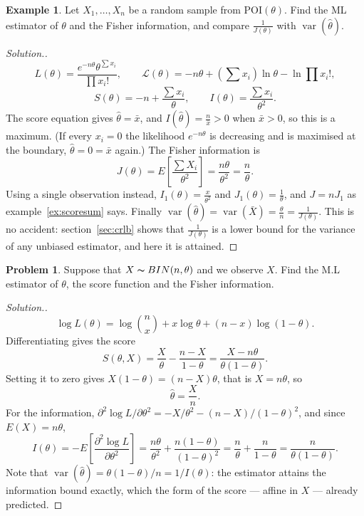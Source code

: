 \documentclass[12pt,a4paper]{report}
\theoremstyle{definition}
\newtheorem{exa}[thm]{Example}
\DeclareMathOperator{\var}{var}
\newtheorem{problemx}{Problem}[section]
\newenvironment{problem}{\begin{problemx}}{\end{problemx}}
\newenvironment{solution}
  {\renewcommand{\qedsymbol}{}\begin{proof}[\textit{Solution}.]}
  {\end{proof}}
\begin{document}
\begin{exa}
\label{ex:poissonmle}
Let $X_1, \dots, X_n$ be a random sample from $\text{POI}(\theta)$. Find the ML
estimator of $\theta$ and the Fisher information, and compare $\frac{1}{J(\theta)}$
with $\var(\hat\theta)$.
\end{exa}

\begin{solution}
\[L(\theta) = \frac{e^{-n\theta}\theta^{\sum x_i}}{\prod x_i!},\qquad
\mathcal{L}(\theta) = -n\theta + \left(\sum x_i\right)\ln\theta - \ln\prod x_i!,\]
\[S(\theta) = -n + \frac{\sum x_i}{\theta},\qquad I(\theta) = \frac{\sum x_i}{\theta^2} .\]
The score equation gives $\hat\theta = \bar x$, and $I(\hat\theta) = \frac{n}{\bar x}>0$
when $\bar x>0$, so this is a maximum. (If every $x_i = 0$ the likelihood $e^{-n\theta}$
is decreasing and is maximised at the boundary, $\hat\theta = 0 = \bar x$ again.)
The Fisher information is
\[J(\theta) = E\left[\frac{\sum X_i}{\theta^2}\right] = \frac{n\theta}{\theta^2} = \frac n\theta .\]
Using a single observation instead, $I_1(\theta) = \frac{x}{\theta^2}$ and
$J_1(\theta) = \frac1\theta$, and $J = nJ_1$ as example~\ref{ex:scoresum} says.
Finally $\var(\hat\theta) = \var(\bar X) = \frac\theta n = \frac{1}{J(\theta)}$. This is
no accident: section~\ref{sec:crlb} shows that $\frac{1}{J(\theta)}$ is a lower bound
for the variance of any unbiased estimator, and here it is attained.
\end{solution}

\begin{problem}
Suppose that $X\thicksim BIN(n,\theta)$ and we observe $X$. Find the M.L estimator of $\theta$, the score function and the Fisher information.
\end{problem}

\begin{solution}
\[\log L(\theta) = \log\binom{n}{x} + x\log\theta + (n-x)\log(1-\theta).\]
Differentiating gives the score
\[S(\theta,X) = \frac{X}{\theta} - \frac{n-X}{1-\theta}
= \frac{X-n\theta}{\theta(1-\theta)} .\]
Setting it to zero gives $X(1-\theta)=(n-X)\theta$, that is $X=n\theta$, so
\[\widehat{\theta} = \frac{X}{n}.\]
For the information, $\partial^{2}\log L/\partial\theta^{2}
= -X/\theta^{2} - (n-X)/(1-\theta)^{2}$, and since $E(X)=n\theta$,
\[I(\theta) = -E\left[\frac{\partial^{2}\log L}{\partial\theta^{2}}\right]
= \frac{n\theta}{\theta^{2}} + \frac{n(1-\theta)}{(1-\theta)^{2}}
= \frac{n}{\theta} + \frac{n}{1-\theta}
= \frac{n}{\theta(1-\theta)} .\]
Note that $\var\left(\widehat{\theta}\right)=\theta(1-\theta)/n = 1/I(\theta)$:
the estimator attains the information bound exactly, which the form of the score
--- affine in $X$ --- already predicted.
\end{solution}
\end{document}
